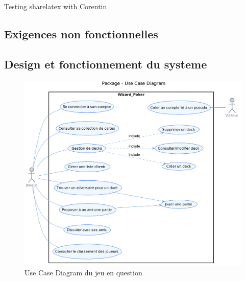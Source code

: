 \documentclass[11pt,a4paper]{article}
\begin{document}
Testing sharelatex with Corentin


\subsection{Exigences non fonctionnelles}
\label{sec:exi-nonfonc-sys}



\subsection{Design et fonctionnement du systeme}
\label{sec:design}


\begin{figure}[ht]
  \centering
  \includegraphics[width=1\textwidth]{uml_files/UseCaseDiagram.png}
  \caption{\label{fig:usecase} Use Case Diagram du jeu en question}
\end{figure}
\end{document}
